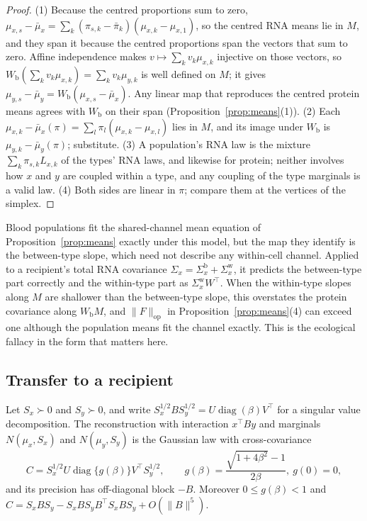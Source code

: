 \begin{proof}
(1) Because the centred proportions sum to zero,
$\mu_{x,s}-\bar\mu_x=\sum_k(\pi_{s,k}-\bar\pi_k)(\mu_{x,k}-\mu_{x,1})$, so the
centred RNA means lie in $M$, and they span it because the centred proportions
span the vectors that sum to zero. Affine independence makes
$v\mapsto\sum_kv_k\mu_{x,k}$ injective on those vectors, so
$W_{\mathrm b}(\sum_kv_k\mu_{x,k})=\sum_kv_k\mu_{y,k}$ is well defined on $M$;
it gives $\mu_{y,s}-\bar\mu_y=W_{\mathrm b}(\mu_{x,s}-\bar\mu_x)$.
Any linear map that reproduces the centred protein means agrees with
$W_{\mathrm b}$ on their span (Proposition~\ref{prop:means}(1)). (2) Each
$\mu_{x,k}-\bar\mu_x(\pi)=\sum_l\pi_l(\mu_{x,k}-\mu_{x,l})$ lies in $M$, and its
image under $W_{\mathrm b}$ is $\mu_{y,k}-\bar\mu_y(\pi)$; substitute. (3) A
population's RNA law is the mixture $\sum_k\pi_{s,k}L_{x,k}$ of the types' RNA
laws, and likewise for protein; neither involves how $x$ and $y$ are coupled
within a type, and any coupling of the type marginals is a valid law. (4) Both
sides are linear in $\pi$; compare them at the vertices of the simplex.
\end{proof}

Blood populations fit the shared-channel mean equation of
Proposition~\ref{prop:means} exactly under this model, but the map they
identify is the between-type slope, which need not describe any within-cell
channel. Applied to a
recipient's total RNA covariance
$\Sigma_x=\Sigma^{\mathrm b}_x+\Sigma^{\mathrm w}_x$, it predicts the
between-type part correctly and the within-type part as
$\Sigma^{\mathrm w}_xW^\top$. When the within-type slopes along $M$ are
shallower than the between-type slope, this overstates the protein covariance
along $W_{\mathrm b}M$, and $\|F\|_{\mathrm{op}}$ in
Proposition~\ref{prop:means}(4) can exceed one although the population means
fit the channel exactly. This is the ecological fallacy
\cite{robinson1950,simpson1951} in the form that matters here.

\subsection*{Transfer to a recipient}
\begin{proposition}\label{prop:gaussian}
Let $S_x\succ0$ and $S_y\succ0$, and write
$S_x^{1/2}BS_y^{1/2}=U\operatorname{diag}(\beta)V^\top$ for a singular value
decomposition. The reconstruction with interaction $x^\top By$ and marginals
$N(\mu_x,S_x)$ and $N(\mu_y,S_y)$ is the Gaussian law with cross-covariance
\[
 C=S_x^{1/2}U\operatorname{diag}\{g(\beta)\}V^\top S_y^{1/2},\qquad
 g(\beta)=\frac{\sqrt{1+4\beta^2}-1}{2\beta},\ g(0)=0,
\]
and its precision has off-diagonal block $-B$. Moreover $0\le g(\beta)<1$ and
$C=S_xBS_y-S_xBS_yB^\top S_xBS_y+O(\|B\|^5)$.
\end{proposition}

